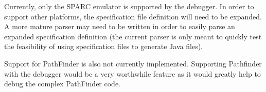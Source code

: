 Currently, only the SPARC emulator is supported by the debugger. In order to 
support other platforms, the specification file definition will need to be 
expanded. A more mature parser may need to be written in order to easily parse 
an expanded specification definition (the current parser is only meant to 
quickly test the feasibility of using specification files to generate Java 
files). 

Support for PathFinder is also not currently implemented. Supporting 
Pathfinder with the debugger would be a very worthwhile feature as it would 
greatly help to debug the complex PathFinder code.


